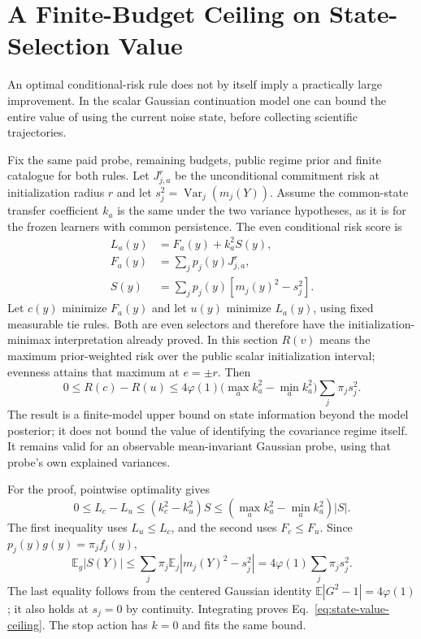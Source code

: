 \section{A Finite-Budget Ceiling on State-Selection Value}
An optimal conditional-risk rule does not by itself imply a practically large improvement.
In the scalar Gaussian continuation model one can bound the entire value of using the current noise state, before collecting scientific trajectories.

Fix the same paid probe, remaining budgets, public regime prior and finite catalogue for both rules.
Let $J_{j,a}^{r}$ be the unconditional commitment risk at initialization radius $r$ and let $s_j^2=\operatorname{Var}_j(m_j(Y))$.
Assume the common-state transfer coefficient $k_a$ is the same under the two variance hypotheses, as it is for the frozen learners with common persistence.
The even conditional risk score is
\begin{align*}
L_a(y)&=F_a(y)+k_a^2S(y),\\
F_a(y)&=\sum_jp_j(y)J_{j,a}^{r},\\
S(y)&=\sum_jp_j(y)[m_j(y)^2-s_j^2].
\end{align*}
Let $c(y)$ minimize $F_a(y)$ and let $u(y)$ minimize $L_a(y)$, using fixed measurable tie rules.
Both are even selectors and therefore have the initialization-minimax interpretation already proved.
In this section $R(v)$ means the maximum prior-weighted risk over the public scalar initialization interval; evenness attains that maximum at $e=\pm r$.
Then
\begin{equation}
0\le R(c)-R(u)
\le4\varphi(1)\bigl(\max_a k_a^2-\min_a k_a^2\bigr)
\sum_j\pi_js_j^2.
\label{eq:state-value-ceiling}
\end{equation}
The result is a finite-model upper bound on state information beyond the model posterior; it does not bound the value of identifying the covariance regime itself.
It remains valid for an observable mean-invariant Gaussian probe, using that probe's own explained variances.

For the proof, pointwise optimality gives
\[
0\le L_c-L_u\le (k_c^2-k_u^2)S
\le(\max_a k_a^2-\min_a k_a^2)|S|.
\]
The first inequality uses $L_u\le L_c$, and the second uses $F_c\le F_u$.
Since $p_j(y)g(y)=\pi_jf_j(y)$,
\[
\mathbb E_g|S(Y)|\le\sum_j\pi_j\mathbb E_j|m_j(Y)^2-s_j^2|
=4\varphi(1)\sum_j\pi_js_j^2.
\]
The last equality follows from the centered Gaussian identity $\mathbb E|G^2-1|=4\varphi(1)$; it also holds at $s_j=0$ by continuity.
Integrating proves Eq.~\eqref{eq:state-value-ceiling}.
The stop action has $k=0$ and fits the same bound.

